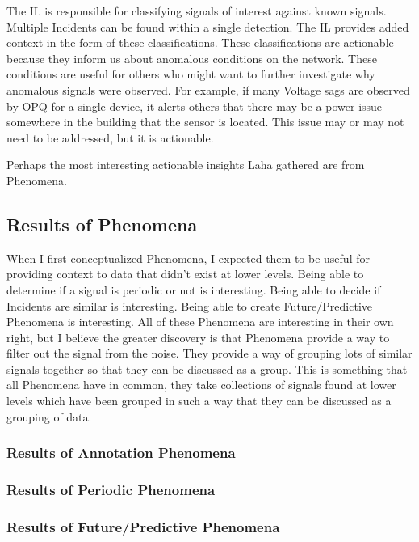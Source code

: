 The IL is responsible for classifying signals of interest against known signals. Multiple Incidents can be found within a single detection. The IL provides added context in the form of these classifications. These classifications are actionable because they inform us about anomalous conditions on the network. These conditions are useful for others who might want to further investigate why anomalous signals were observed. For example, if many Voltage sags are observed by OPQ for a single device, it alerts others that there may be a power issue somewhere in the building that the sensor is located. This issue may or may not need to be addressed, but it is actionable.

Perhaps the most interesting actionable insights Laha gathered are from Phenomena.

\subsection{Results of Phenomena}\label{subsec:results-of-phenomena}

When I first conceptualized Phenomena, I expected them to be useful for providing context to data that didn't exist at lower levels. Being able to determine if a signal is periodic or not is interesting. Being able to decide if Incidents are similar is interesting. Being able to create Future/Predictive Phenomena is interesting. All of these Phenomena are interesting in their own right, but I believe the greater discovery is that Phenomena provide a way to filter out the signal from the noise. They provide a way of grouping lots of similar signals together so that they can be discussed as a group. This is something that all Phenomena have in common, they take collections of signals found at lower levels which have been grouped in such a way that they can be discussed as a grouping of data.

\subsubsection{Results of Annotation Phenomena}

\subsubsection{Results of Periodic Phenomena}

\subsubsection{Results of Future/Predictive Phenomena}


